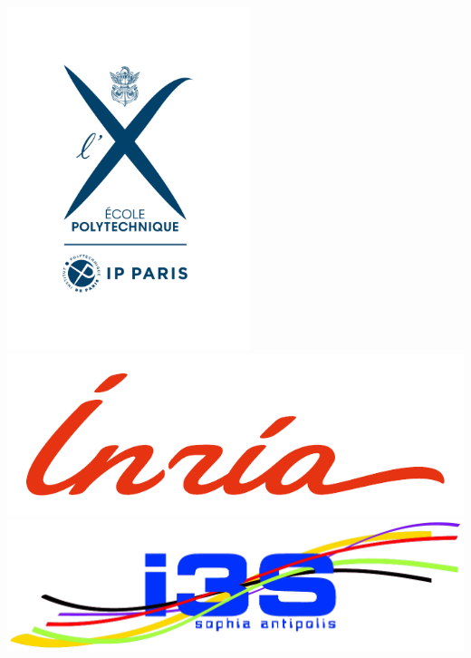 \begin{titlepage}
  \vfill
  \centering
  \includegraphics[height=100mm]{figures/Ecole_polytechnique_signature}\\
  \includegraphics[width=.3\paperwidth]{figures/inr_logo_rouge_rvb}
  \hspace*{2em}
  \includegraphics[width=.3\paperwidth]{figures/NewlogoI3S}\\[-5em]
\end{titlepage}


\makeatletter
\clearpage
\thispagestyle{empty}
\vspace*{\fill}
\noindent\@author\\[0.2em]
\noindent\textbf{\@title}


